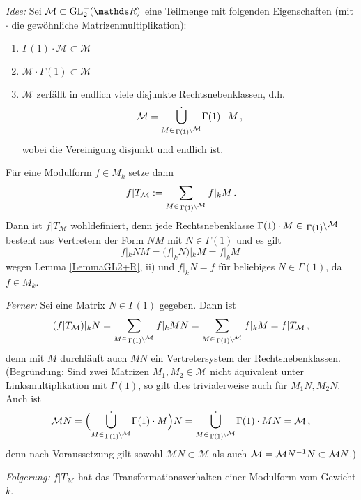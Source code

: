 \emph{Idee:} Sei $\mathcal{M} \subset \GL_2^+(\RR)$ eine Teilmenge mit folgenden Eigenschaften (mit $\cdot$ die gewöhnliche Matrizenmultiplikation): \begin{enumerate}
\item $\Gamma (1) \cdot \mathcal M \subset \mathcal M$
\item $\mathcal M \cdot \Gamma(1) \subset \mathcal M$
\item $\mathcal M$ zerfällt in endlich viele disjunkte Rechtsnebenklassen, d.h.
\[
\mathcal M = \dot{\bigcup_{M \in \linksmodulo{\Gamma(1)}{\mathcal M}}} \Gamma(1) \cdot M
\,,
\]
wobei die Vereinigung disjunkt und endlich ist. 
\end{enumerate}
Für eine Modulform $f \in M_k$ setze dann
\[
f | T_{\mathcal M} := \sum_{M \in \linksmodulo{\Gamma(1)}{\mathcal M}} f|_k M
\,.
\]
Dann ist $f | T_{\mathcal M}$ wohldefiniert, denn jede Rechtsnebenklasse $\Gamma (1) \cdot M \in \linksmodulo{\Gamma(1)}{\mathcal M}$ besteht aus Vertretern der Form $N M$ mit $N \in \Gamma (1)$ und es gilt
\[
f |_k N M = (f |_k N) |_k M = f |_k M
\,
\]
wegen Lemma \ref{LemmaGL2+R}, ii) und $f |_k N = f$ für beliebiges $N \in \Gamma (1)$, da $f \in M_k$.

\emph{Ferner:} Sei eine Matrix $N \in \Gamma(1)$ gegeben. Dann ist 
\[
(f | T_{\mathcal M}) |_k N = \sum_{M \in \linksmodulo{\Gamma(1)}{\mathcal M}} f |_k M N = \sum_{M \in \linksmodulo{\Gamma(1)}{\mathcal M}} f |_k M = f | T_{\mathcal M}
\,,
\]
denn mit $M$ durchläuft auch $MN$ ein Vertretersystem der Rechtsnebenklassen. (Begründung: Sind zwei Matrizen $M_1, M_2 \in \mathcal M$ nicht äquivalent unter Linksmultiplikation mit $\Gamma(1)$, so gilt dies trivialerweise auch für $M_1N, M_2N$. Auch ist
\[
\mathcal M N = \Bigl( \dot{\bigcup_{M \in \linksmodulo{\Gamma(1)}{\mathcal M}}} \Gamma(1) \cdot M \Bigr) N = \dot{\bigcup_{M \in \linksmodulo{\Gamma(1)}{\mathcal M}}} \Gamma(1) \cdot M N = \mathcal M
\,,
\]
denn nach Voraussetzung gilt sowohl $\mathcal M N \subset \mathcal M$ als auch $\mathcal M = \mathcal M N^{-1}N \subset \mathcal M N$.)

\emph{Folgerung:} $f | T_{\mathcal M}$ hat das Transformationsverhalten einer Modulform vom Gewicht $k$.
